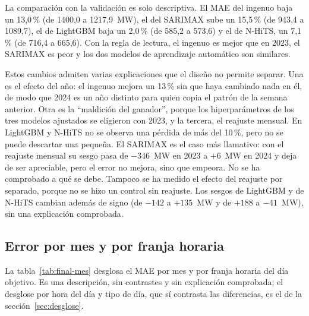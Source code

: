 La comparación con la validación es solo descriptiva. El MAE del ingenuo baja un
13,0\,\% (de 1400,0 a 1217,9~MW), el del SARIMAX sube un 15,5\,\% (de 943,4 a
1089,7), el de LightGBM baja un 2,0\,\% (de 585,2 a 573,6) y el de N-HiTS, un
7,1\,\% (de 716,4 a 665,6). Con la regla de lectura, el ingenuo es mejor que en
2023, el SARIMAX es peor y los dos modelos de aprendizaje automático son
similares.

Estos cambios admiten varias explicaciones que el diseño no permite separar.
Una es el efecto del año: el ingenuo mejora un 13\,\% sin que haya cambiado
nada en él, de modo que 2024 es un año distinto para quien copia el patrón de la
semana anterior. Otra es la \enquote{maldición del ganador}, porque los
hiperparámetros de los tres modelos ajustados se eligieron con 2023, y la tercera, el
reajuste mensual. En LightGBM y N-HiTS no se observa una pérdida de más del 10\,\%, pero no
se puede descartar una pequeña. El
SARIMAX es el caso más llamativo: con el reajuste mensual su sesgo pasa de
$-346$~MW en 2023 a $+6$~MW en 2024 y deja de ser apreciable, pero el error no
mejora, sino que empeora. No se ha comprobado a qué se debe. Tampoco se ha
medido el efecto del reajuste por separado, porque no se hizo un control sin
reajuste. Los sesgos de LightGBM y de N-HiTS cambian además de signo (de
$-142$ a $+135$~MW y de $+188$ a $-41$~MW), sin una explicación comprobada.

\subsection{Error por mes y por franja horaria}\label{sec:final-mes}

La tabla~\ref{tab:final-mes} desglosa el MAE por mes y por franja horaria del
día objetivo. Es una descripción, sin contrastes y sin explicación comprobada;
el desglose por hora del día y tipo de día, que sí contrasta las diferencias,
es el de la sección~\ref{sec:desglose}.

